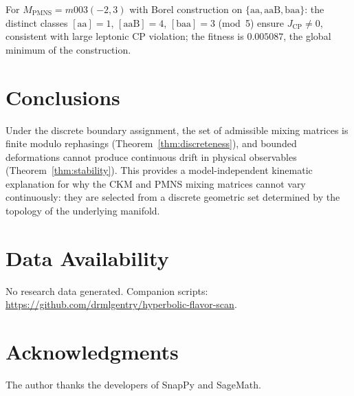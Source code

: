\documentclass[11pt,a4paper]{article}
\begin{document}
For $M_{\mathrm{PMNS}}=m003(-2,3)$ with Borel construction on
$\{\mathrm{aa},\mathrm{aaB},\mathrm{baa}\}$:
the distinct classes $[\mathrm{aa}]=1$, $[\mathrm{aaB}]=4$,
$[\mathrm{baa}]=3$ (mod~5) ensure $J_{\mathrm{CP}}\neq0$,
consistent with large leptonic CP violation;
the fitness is $0.005087$, the global minimum of the construction.

\section{Conclusions}
\label{sec:conclusion}

Under the discrete boundary assignment, the set of admissible mixing
matrices is finite modulo rephasings (Theorem~\ref{thm:discreteness}),
and bounded deformations cannot produce continuous drift in physical
observables (Theorem~\ref{thm:stability}).
This provides a model-independent kinematic explanation for why the
CKM and PMNS mixing matrices cannot vary continuously: they are
selected from a discrete geometric set determined by the topology
of the underlying manifold.

\section*{Data Availability}
No research data generated.
Companion scripts: \url{https://github.com/drmlgentry/hyperbolic-flavor-scan}.

\section*{Acknowledgments}
The author thanks the developers of SnapPy and SageMath.
\end{document}
